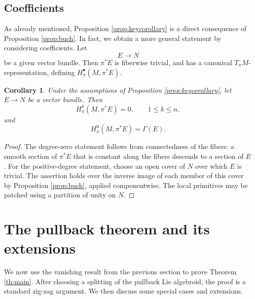 \documentclass[11pt]{amsart}
\newtheorem{corollary}[theorem]{Corollary}
\theoremstyle{definition}
\theoremstyle{remark}
\begin{document}
\subsection{Coefficients}
%
As already mentioned, Proposition \ref{prop:keycorollary} 
is a direct consequence of Proposition \ref{prop:buch}. In fact, we obtain a more general statement by considering coefficients. 
Let 
\[ E\to N\]
be a given vector bundle. Then $\pi^*E$ is fiberwise trivial, and has a canonical $T_\pi M$-representation, 
defining $H^\bullet_\pi(M,\pi^*E)$.

\begin{corollary}\label{cor:buchcorollary}
	Under the assumptions of Proposition \ref{prop:keycorollary}, let $E\to N$ be a vector
	bundle. Then
	\[
	H^k_\pi(M,\pi^*E)=0,
	\qquad 1\leq k\leq n,
	\]
	and
	\[
	H^0_\pi(M,\pi^*E)=\Gamma(E).
	\]
\end{corollary}
\begin{proof}
	The degree-zero statement follows from connectedness of the fibers:
	a smooth section of $\pi^*E$ that is constant along the fibers
	descends to a section of $E$. For the positive-degree
	statement, choose an open cover of $N$ over which $E$ is trivial.
	The assertion holds over the inverse image of each member of this cover by
	Proposition \ref{prop:buch}, applied componentwise. The local primitives may be
	patched using a partition of unity on $N$.
\end{proof}

\section{The pullback theorem and its extensions}
We now use the vanishing result from the previous section to prove
Theorem \ref{th:main}. After choosing a splitting of the pullback Lie algebroid,
the proof is a standard zig-zag argument. We then discuss some special cases and
extensions.
\end{document}
